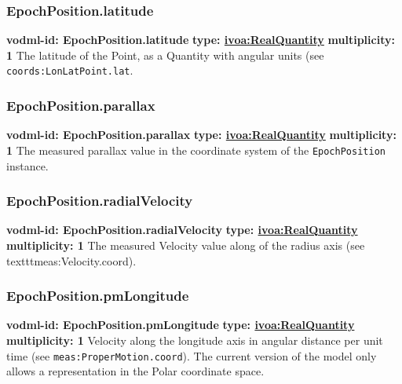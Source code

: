     \subsubsection{EpochPosition.latitude}
      \textbf{vodml-id: EpochPosition.latitude} \newline
      \textbf{type: \hyperref[sect:ivoa]{ivoa:RealQuantity}} \newline
      \textbf{multiplicity: 1} \newline 
      The latitude of the Point, as a Quantity with angular units (see \texttt{coords:LonLatPoint.lat}.

    \subsubsection{EpochPosition.parallax}
      \textbf{vodml-id: EpochPosition.parallax} \newline
      \textbf{type: \hyperref[sect:ivoa]{ivoa:RealQuantity}} \newline
      \textbf{multiplicity: 1} \newline 
      The measured parallax value in the coordinate system of the \texttt{EpochPosition} instance.

    \subsubsection{EpochPosition.radialVelocity}
      \textbf{vodml-id: EpochPosition.radialVelocity} \newline
      \textbf{type: \hyperref[sect:ivoa]{ivoa:RealQuantity}} \newline
      \textbf{multiplicity: 1} \newline 
      The measured Velocity value along of the radius axis (see texttt{meas:Velocity.coord}).

    \subsubsection{EpochPosition.pmLongitude}
      \textbf{vodml-id: EpochPosition.pmLongitude} \newline
      \textbf{type: \hyperref[sect:ivoa]{ivoa:RealQuantity}} \newline
      \textbf{multiplicity: 1} \newline 
      Velocity along the longitude axis in angular distance per unit time (see \texttt{meas:ProperMotion.coord}). The current version of the model only allows a representation in the Polar coordinate space.

